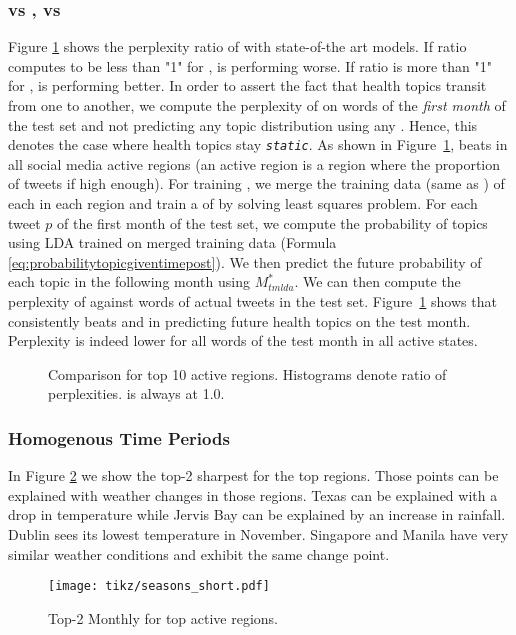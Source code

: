 \subsubsection{\tmatam vs \atam, \tmlda vs \lda}
Figure \ref{fig:perplexity} shows the perplexity ratio of \tmatam with state-of-the art models. If ratio computes to be less than "1" for \competitor, \tmatam is performing worse. If ratio is more than "1" for \competitor, \tmatam is performing better. In order to assert the fact that health topics transit from one to another, we compute the perplexity of \atam on words of the \textit{first month} of the test set and not predicting any topic distribution using any \transition. Hence, this denotes the case where health topics stay \texttt{\emph{static}}. As shown in Figure~\ref{fig:perplexity}, \tmatam beats \atam in all social media active regions (an active region is a region where the proportion of tweets if high enough). For training {\tmlda}, we merge the training data (same as \tmatam) of each \season in each region and train a \transition of \tmlda by solving least squares problem. For each tweet $p$ of the first month of the test set, we compute the probability of topics using LDA trained on merged training data (Formula \ref{eq:probabilitytopicgiventimepost}). We then predict the future probability of each topic in the following month using  $M_{tmlda}^*$. We can then compute the perplexity of \tmlda against words of actual tweets in the test set. Figure~\ref{fig:perplexity} shows that \tmatam consistently beats \tmlda and \lda in predicting future health topics on the test month. Perplexity is indeed lower for all words of the test month in all active states.
\begin{figure}[t!]
\centering
{}
\caption{Comparison for top 10 active regions. Histograms denote ratio of perplexities. \tmatam is always at 1.0.}  %
\label{fig:perplexity}
\end{figure}
\subsubsection{Homogenous Time Periods}
\label{subsubsec:season}
In Figure \ref{fig:seasonBoundary:NonUS}
we show the top-2 sharpest \changes for the top regions. Those points can be explained with weather
changes in those regions. Texas can be explained with a
drop in temperature while Jervis Bay can be explained by an increase in
rainfall. Dublin sees its lowest temperature in November.
Singapore and Manila have very similar weather conditions and exhibit
the same change point.
\begin{figure}[h!]
\centering
\texttt{[image: tikz/seasons\_short.pdf]}
\caption{Top-2 Monthly \season for top active regions.}
\label{fig:seasonBoundary:NonUS}
\end{figure}
